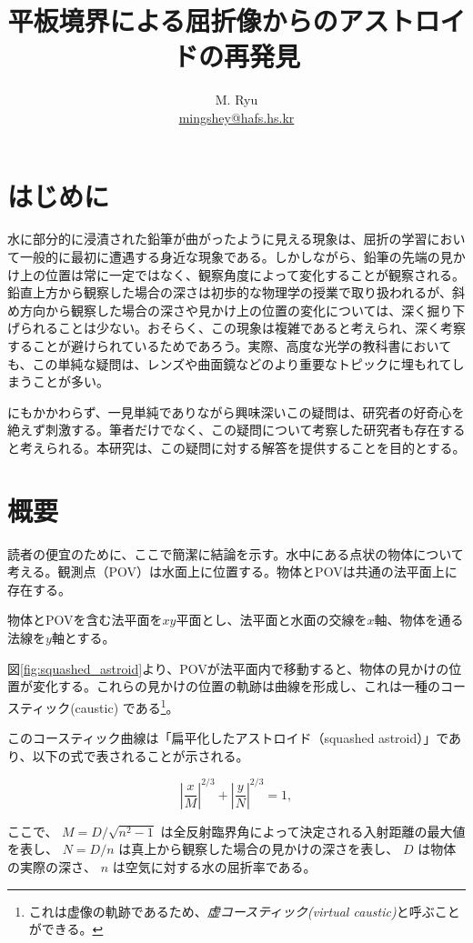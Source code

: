 \documentclass[twocolumn]{article}
\title{平板境界による屈折像からのアストロイドの再発見}  %
\author{M. Ryu \\ {\href{mailto:mingshey@hafs.hs.kr}{mingshey@hafs.hs.kr}}}
\begin{document}
\renewcommand{\figurename}{図}
	\maketitle
	
	\section{はじめに}
	
	水に部分的に浸漬された鉛筆が曲がったように見える現象は、屈折の学習において一般的に最初に遭遇する身近な現象である。しかしながら、鉛筆の先端の見かけ上の位置は常に一定ではなく、観察角度によって変化することが観察される。鉛直上方から観察した場合の深さは初歩的な物理学の授業で取り扱われるが、斜め方向から観察した場合の深さや見かけ上の位置の変化については、深く掘り下げられることは少ない。おそらく、この現象は複雑であると考えられ、深く考察することが避けられているためであろう。実際、高度な光学の教科書においても、この単純な疑問は、レンズや曲面鏡などのより重要なトピックに埋もれてしまうことが多い。
	
	にもかかわらず、一見単純でありながら興味深いこの疑問は、研究者の好奇心を絶えず刺激する。筆者だけでなく、この疑問について考察した研究者も存在すると考えられる。本研究は、この疑問に対する解答を提供することを目的とする。

\section{概要}

読者の便宜のために、ここで簡潔に結論を示す。水中にある点状の物体について考える。観測点（POV）は水面上に位置する。物体とPOVは共通の法平面上に存在する。

物体とPOVを含む法平面を$xy$平面とし、法平面と水面の交線を$x$軸、物体を通る法線を$y$軸とする。

図\ref{fig:squashed_astroid}より、POVが法平面内で移動すると、物体の見かけの位置が変化する。これらの見かけの位置の軌跡は曲線を形成し、これは一種のコースティック(caustic) である\footnote{これは虚像の軌跡であるため、\textit{虚コースティック(virtual caustic)}と呼ぶことができる。}。

このコースティック曲線は「扁平化したアストロイド（squashed astroid）」であり、以下の式で表されることが示される。

$$ \left| \dfrac{x}{M} \right| ^ {2/3} + \left| \dfrac{y}{N} \right| ^ {2/3} = 1,$$

ここで、
$M = D/\sqrt{n^2 - 1}$ は全反射臨界角によって決定される入射距離の最大値を表し、
$N = D/n$ は真上から観察した場合の見かけの深さを表し、
$D$ は物体の実際の深さ、
$n$ は空気に対する水の屈折率である。
\end{document}
